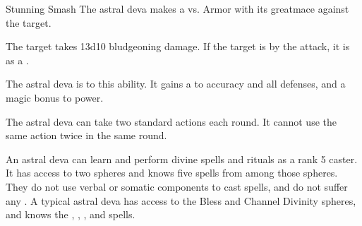    \begin{freeability}{Stunning Smash}
       The astral deva makes a 
         vs. Armor
        with its greatmace against the target.
    
    \hit The target takes 13d10 bludgeoning damage. If the target is  by the attack, it is  as a .
    \end{freeability}
  
              The astral deva is  to this ability.
              It gains a   to accuracy and all defenses, and a  magic bonus to power.
            
              The astral deva can take two standard actions each round.
              It cannot use the same action twice in the same round.
            
              An astral deva can learn and perform divine spells and rituals as a rank 5 caster.
              It has access to two spheres and knows five spells from among those spheres.
              They do not use verbal or somatic components to cast spells, and do not suffer any .
              A typical astral deva has access to the Bless and Channel Divinity spheres, and knows the , , ,  and  spells.
            
